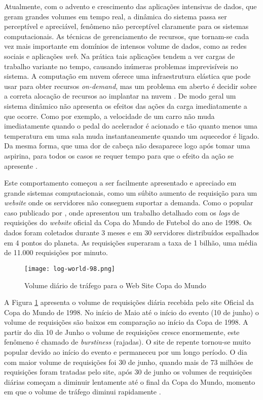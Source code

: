 Atualmente, com o advento e crescimento das aplicações intensivas de dados, que geram grandes volumes em tempo real, a dinâmica do sistema passa ser perceptível e apreciável, fenômeno não perceptível claramente para os sistemas computacionais. As técnicas de gerenciamento de recursos, que tornam-se cada vez mais importante em domínios de intensos volume de dados, como as redes sociais e aplicações \textit{web}. Na prática tais aplicações tendem a ver cargas de trabalho variante no tempo, causando inúmeras problemas imprevisíveis no sistema. A computação em nuvem oferece uma infraestrutura elástica que pode usar para obter recursos \textit{on-demand}, mas um problema em aberto é decidir sobre a correta alocação de recursos ao implantar na nuvem \cite{Cervino2012}. De modo geral um sistema dinâmico não apresenta os efeitos das ações da carga imediatamente a que ocorre. Como por exemplo, a velocidade de um carro não muda imediatamente quando o pedal do acelerador é acionado e tão quanto menos uma temperatura em uma sala muda instantaneamente quando um aquecedor é ligado. Da mesma forma, que uma dor de cabeça não desaparece logo após tomar uma aspirina, para todos os casos se requer tempo para que o efeito da ação se apresente \cite{Karl2008}.

Este comportamento começou a ser facilmente apresentado e apreciado em grande sistemas computacionais, como um súbito aumento de requisição para um \textit{website} onde os servidores não conseguem suportar a demanda. Como o popular caso publicado por , onde apresentou um trabalho detalhado com os \textit{logs} de requisições do \textit{website} oficial da Copa do Mundo de Futebol do ano de 1998. Os dados foram coletados durante 3 meses e em 30 servidores distribuídos espalhados em 4 pontos do planeta. As requisições superaram a taxa de 1 bilhão, uma média de 11.000 requisições por minuto.

\begin{figure}[htb]
	\centering
	\texttt{[image: log-world-98.png]}
	\caption{Volume diário de tráfego para o Web Site Copa do Mundo}
	\label{fig:log98}		
\end{figure}

A Figura \ref{fig:log98} apresenta o volume de requisições diária recebida pelo site Oficial da Copa do Mundo de 1998. No início de Maio até o início do evento (10 de junho) o volume de requisições são baixos em comparação ao início da Copa de 1998. A partir do dia 10 de Junho o volume de requisições cresce enormemente, este fenômeno é chamado de \textit{burstiness} (rajadas). O site de repente tornou-se muito popular devido ao início do evento e permaneceu por um longo período. O dia com maior volume de requisições foi 30 de junho, quando mais de 73 milhões de requisições foram tratadas pelo site, após 30 de junho os volumes de requisições diárias começam a diminuir lentamente até o final da Copa do Mundo, momento em que o volume de tráfego diminui rapidamente \cite{Arlitt2000}.


